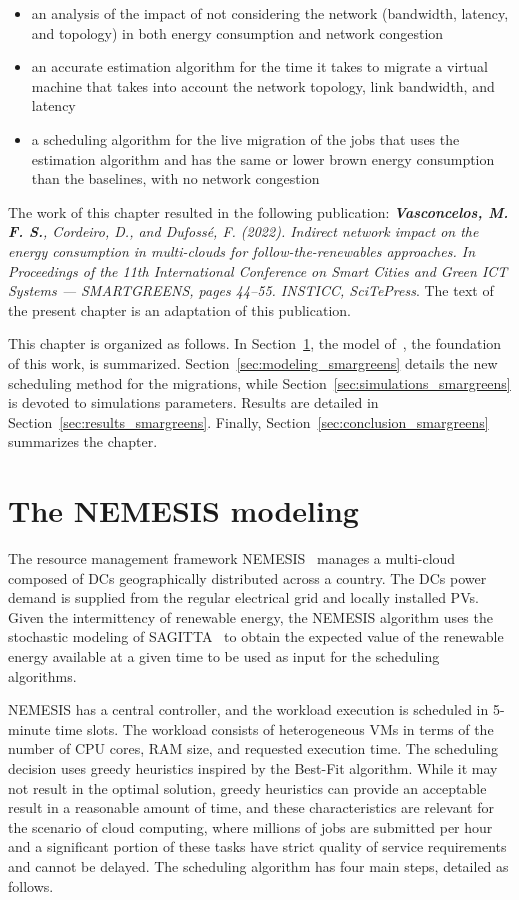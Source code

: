 \begin{itemize}
    \item an analysis of the impact of not considering the network (bandwidth, latency, and topology) in both energy consumption and network congestion
    \item an accurate estimation algorithm for the time it takes to migrate a virtual machine that takes into account the network topology, link bandwidth, and latency
    \item a scheduling algorithm for the live migration of the jobs that uses the estimation algorithm and has the same or lower brown energy consumption than the baselines, with no network congestion
\end{itemize}
    
The work of this chapter resulted in the following publication:  \textit{\textbf{Vasconcelos, M. F. S.}, Cordeiro, D., and Dufossé, F. (2022). Indirect network impact on the energy consumption in multi-clouds for follow-the-renewables approaches. In Proceedings of the 11th International Conference on Smart Cities and Green ICT Systems — SMARTGREENS, pages 44–55. INSTICC, SciTePress}. The text of the present chapter is an adaptation of this publication.

This chapter is organized as follows. In Section~\ref{sec:nemesis}, the model of~\citet{NEMESIS}, the foundation of this work, is summarized. Section~\ref{sec:modeling_smargreens} details the new scheduling method for the migrations, while Section~\ref{sec:simulations_smargreens} is devoted to simulations parameters. Results are detailed in Section~\ref{sec:results_smargreens}. Finally, Section~\ref{sec:conclusion_smargreens} summarizes the chapter.


\section{The NEMESIS modeling}
\label{sec:nemesis}

The resource management framework NEMESIS~\cite{NEMESIS} manages a multi-cloud composed of DCs geographically distributed across a country. The DCs power demand is supplied from the regular electrical grid and locally installed PVs. Given the intermittency of renewable energy, the NEMESIS algorithm uses the stochastic modeling of SAGITTA~\cite{SAGITTA} to obtain the expected value of the renewable energy available at a given time to be used as input for the scheduling algorithms.

NEMESIS has a central controller, and the workload execution is scheduled in 5-minute time slots. The workload consists of heterogeneous VMs in terms of the number of CPU cores, RAM size, and requested execution time. The scheduling decision uses greedy heuristics inspired by the Best-Fit algorithm. While it may not result in the optimal solution, greedy heuristics can provide an acceptable result in a reasonable amount of time, and these characteristics are relevant for the scenario of cloud computing, where millions of jobs are submitted per hour and a significant portion of these tasks have strict quality of service requirements and cannot be delayed. The scheduling algorithm has four main steps, detailed as follows.

